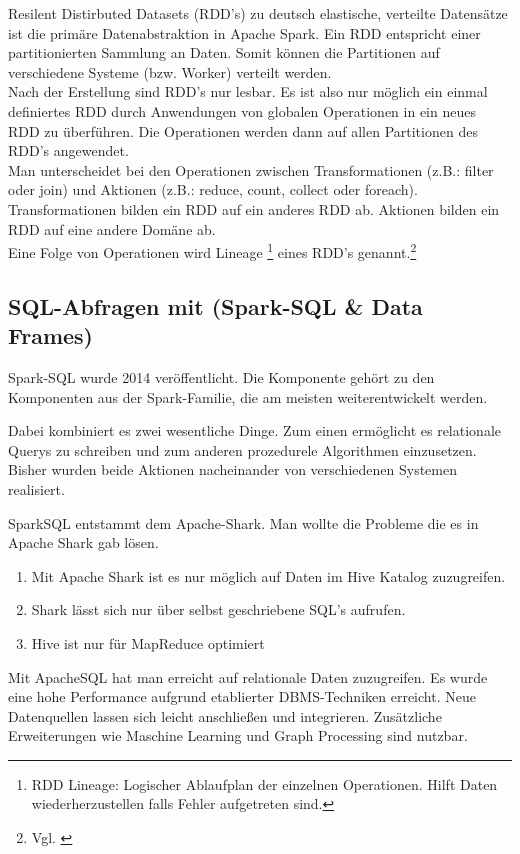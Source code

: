 \noindent
Resilent Distirbuted Datasets (RDD's) zu deutsch elastische, verteilte Datensätze ist die primäre Datenabstraktion in Apache Spark. 
Ein RDD entspricht einer partitionierten Sammlung an Daten. Somit können die Partitionen auf verschiedene Systeme (bzw. Worker) verteilt werden.  \\
Nach der Erstellung sind RDD's nur lesbar. Es ist also nur möglich ein einmal definiertes RDD durch Anwendungen von globalen Operationen in ein neues RDD zu überführen. Die Operationen werden dann auf allen Partitionen des RDD's angewendet. \\
\noindent
Man unterscheidet bei den Operationen zwischen Transformationen (z.B.: filter oder join) und Aktionen (z.B.: reduce, count, collect oder foreach). Transformationen bilden ein RDD auf ein anderes RDD ab. Aktionen bilden ein RDD auf eine andere Domäne ab.\\ %
\noindent
Eine Folge von Operationen wird Lineage \footnote{RDD Lineage: Logischer Ablaufplan der einzelnen Operationen. Hilft Daten wiederherzustellen falls Fehler aufgetreten sind.} eines RDD's genannt.\footnote{Vgl. \cite{ZC+12}}



\newpage
\subsection{SQL-Abfragen mit (Spark-SQL \& Data Frames)}

Spark-SQL wurde 2014 veröffentlicht. Die Komponente gehört zu den Komponenten aus der Spark-Familie, die am meisten weiterentwickelt werden. 


Dabei kombiniert es zwei wesentliche Dinge. Zum einen ermöglicht es relationale Querys zu schreiben und zum anderen prozedurele Algorithmen einzusetzen. Bisher wurden beide Aktionen nacheinander von verschiedenen Systemen realisiert. 

SparkSQL entstammt dem Apache-Shark. Man wollte die Probleme die es in Apache Shark gab lösen.
\begin{enumerate}
	\item Mit Apache Shark ist es nur möglich auf Daten im Hive Katalog zuzugreifen. 
	\item Shark lässt sich nur über selbst geschriebene SQL's aufrufen. 
	\item Hive ist nur für MapReduce optimiert
\end{enumerate}

Mit ApacheSQL hat man erreicht auf relationale Daten zuzugreifen. Es wurde eine hohe Performance aufgrund etablierter DBMS-Techniken erreicht.
Neue Datenquellen lassen sich leicht anschließen und integrieren.
Zusätzliche Erweiterungen wie Maschine Learning und Graph Processing sind nutzbar.

